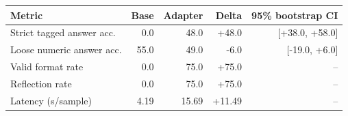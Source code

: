 \begin{tabular}{lrrrr}
\toprule
Metric & Base & Adapter & Delta & 95\% bootstrap CI \\ 
\midrule
Strict tagged answer acc. & 0.0 & 48.0 & +48.0 & [+38.0, +58.0] \\ 
Loose numeric answer acc. & 55.0 & 49.0 & -6.0 & [-19.0, +6.0] \\ 
Valid format rate & 0.0 & 75.0 & +75.0 & -- \\ 
Reflection rate & 0.0 & 75.0 & +75.0 & -- \\ 
Latency (s/sample) & 4.19 & 15.69 & +11.49 & -- \\ 
\bottomrule
\end{tabular}
